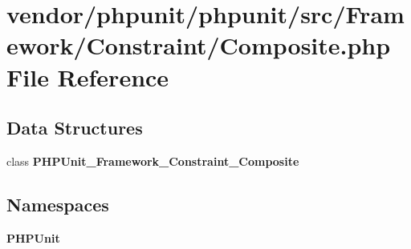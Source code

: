 \section{vendor/phpunit/phpunit/src/\+Framework/\+Constraint/\+Composite.php File Reference}
\label{_composite_8php}
\subsection*{Data Structures}
\begin{DoxyCompactItemize}
\item 
class {\bf P\+H\+P\+Unit\+\_\+\+Framework\+\_\+\+Constraint\+\_\+\+Composite}
\end{DoxyCompactItemize}
\subsection*{Namespaces}
\begin{DoxyCompactItemize}
\item 
 {\bf P\+H\+P\+Unit}
\end{DoxyCompactItemize}
